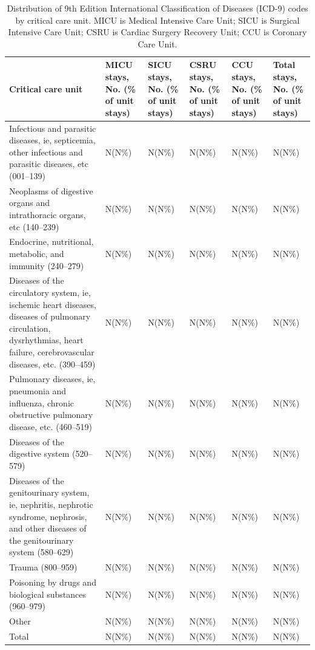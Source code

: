 \documentclass[english]{article}
\begin{document}
\begin{center}
\begin{table}
\begin{tabular}{|p{4.5cm}|p{1.6cm}|p{1.6cm}|p{1.6cm}|
p{1.6cm}|p{1.6cm}|}
    \hline
    Critical care unit & 
    MICU stays, No. (\% of unit stays) & 
    SICU stays, No. (\% of unit stays) & 
    CSRU stays, No. (\% of unit stays) & 
    CCU stays, No. (\% of unit stays) & 
    Total stays, No. (\% of unit stays) \\ 
    \hline
    Infectious and parasitic diseases, ie, septicemia, other infectious and parasitic diseases, etc (001–139)
    & N(N\%) & N(N\%) & N(N\%) & N(N\%) & N(N\%) \\ 
    \hline
    Neoplasms of digestive organs and intrathoracic organs, etc (140–239)
    & N(N\%) & N(N\%) & N(N\%) & N(N\%) & N(N\%) \\ 
    \hline
    Endocrine, nutritional, metabolic, and immunity (240–279) 
    & N(N\%) & N(N\%) & N(N\%) & N(N\%) & N(N\%) \\ 
    \hline
    Diseases of the circulatory system, ie, ischemic heart diseases, diseases of pulmonary circulation, dysrhythmias, heart failure, cerebrovascular diseases, etc. (390–459) 
    & N(N\%) & N(N\%) & N(N\%) & N(N\%) & N(N\%) \\ 
    \hline
    Pulmonary diseases, ie, pneumonia and influenza, chronic obstructive pulmonary disease, etc. (460–519) 
    & N(N\%) & N(N\%) & N(N\%) & N(N\%) & N(N\%) \\ 
    \hline
    Diseases of the digestive system (520–579) 
    & N(N\%) & N(N\%) & N(N\%) & N(N\%) & N(N\%) \\ 
    \hline
    Diseases of the genitourinary system, ie, nephritis, nephrotic syndrome, nephrosis, and other diseases of the genitourinary system (580–629) 
    & N(N\%) & N(N\%) & N(N\%) & N(N\%) & N(N\%) \\ 
    \hline
    Trauma (800–959) 
    & N(N\%) & N(N\%) & N(N\%) & N(N\%) & N(N\%) \\ 
    \hline
    Poisoning by drugs and biological substances (960–979) 
    & N(N\%) & N(N\%) & N(N\%) & N(N\%) & N(N\%) \\ 
    \hline
    Other & N(N\%) & N(N\%) & N(N\%) & N(N\%) & N(N\%) \\ 
    \hline
    Total & N(N\%) & N(N\%) & N(N\%) & N(N\%) & N(N\%) \\ 
    \hline
\end{tabular}
\caption{Distribution of 9th Edition International Classification of Diseases (ICD-9) codes by critical care unit. MICU is Medical Intensive Care Unit; SICU is Surgical Intensive Care Unit; CSRU is Cardiac Surgery Recovery Unit; CCU is Coronary Care Unit.}
\label{table:icddistribution}
\end{table}
\end{center}
\end{document}

